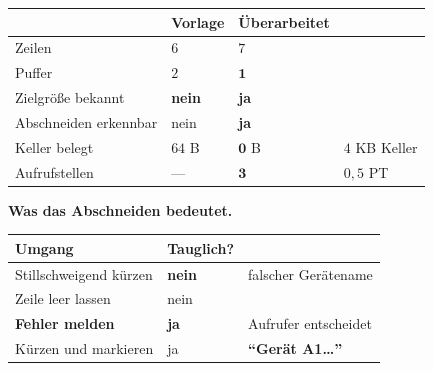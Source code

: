 \begin{merksatz}
\begin{center}
{\small
\renewcommand{\arraystretch}{1.45}
\begin{tabular}{@{}P{2.8cm}P{2.0cm}P{2.2cm}P{2.0cm}@{}}
\toprule
& \textbf{Vorlage} & \textbf{Überarbeitet} & \\
\midrule
Zeilen & $6$ & $7$ & \\
Puffer & $2$ & $\mathbf{1}$ & \\
Zielgröße bekannt & \textcolor{akzent}{\textbf{nein}} & \textcolor{gruen}{\textbf{ja}} & \\
Abschneiden erkennbar & \textcolor{akzent}{nein} & \textcolor{gruen}{\textbf{ja}} & \\
Keller belegt & $64$ B & $\mathbf{0}$ B & \textcolor{gruen}{$4$ KB Keller}\\
Aufrufstellen & --- & $\mathbf{3}$ & $0{,}5$ PT\\
\bottomrule
\end{tabular}}
\end{center}

\begin{center}
\begin{minipage}{0.88\textwidth}
\end{minipage}
\end{center}

\textbf{Was das Abschneiden bedeutet.}

\begin{center}
\renewcommand{\arraystretch}{1.45}
\begin{tabular}{@{}P{3.0cm}P{2.2cm}P{2.6cm}@{}}
\toprule
\textbf{Umgang} & \textbf{Tauglich?} & \\
\midrule
Stillschweigend kürzen & \textcolor{akzent}{\textbf{nein}} & \textcolor{akzent}{falscher Gerätename}\\
Zeile leer lassen & \textcolor{akzent}{nein} & \\
\textbf{Fehler melden} & \textcolor{gruen}{\textbf{ja}} & \textcolor{gruen}{Aufrufer entscheidet}\\
Kürzen und markieren & \textcolor{gruen}{ja} & \textbf{\enquote{Gerät A1\ldots}}\\
\bottomrule
\end{tabular}
\end{center}

\begin{center}
\end{center}
\end{merksatz}

